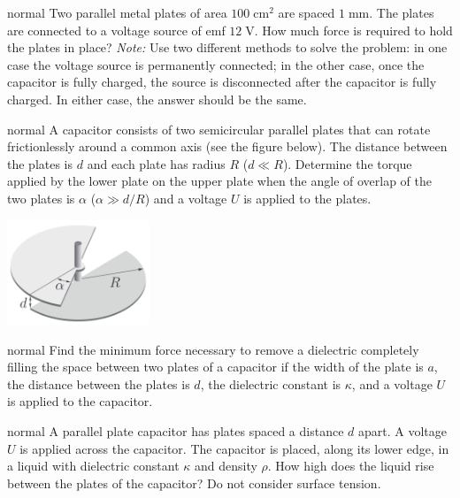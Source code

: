 \hypertarget{P51}{}
\begin{solution}{normal} %
Two parallel metal plates of area $100\;\text{cm}^2$ are spaced $1\;\text{mm}$. The plates are connected to a voltage source of emf $12\;\text{V}$. How much force is required to hold the plates in place? \textit{Note:} Use two different methods to solve the problem: in one case the voltage source is permanently connected; in the other case, once the capacitor is fully charged, the source is disconnected after the capacitor is fully charged. In either case, the answer should be the same. 
\end{solution}

\hypertarget{P52}{}
\begin{solution}{normal} %
A capacitor consists of two semicircular parallel plates that can rotate frictionlessly around a common axis (see the figure below). The distance between the plates is $d$ and each plate has radius $R$ ($d\ll R$). Determine the torque applied by the lower plate on the upper plate when the angle of overlap of the two plates is $\alpha$ ($\alpha\gg d/R$) and a voltage $U$ is applied to the plates.
\begin{center}
    \includegraphics[width=0.32\textwidth]{S2 Figures/S2-52.png}
\end{center}
\end{solution}

\hypertarget{P53}{}
\begin{solution}{normal} %
Find the minimum force necessary to remove a dielectric completely filling the space between two plates of a capacitor if the width of the plate is $a$, the distance between the plates is $d$, the dielectric constant is $\kappa$, and a voltage $U$ is applied to the capacitor.
\end{solution}

\hypertarget{P54}{}
\begin{solution}{normal} %
A parallel plate capacitor has plates spaced a distance $d$ apart. A voltage $U$ is applied across the capacitor. The capacitor is placed, along its lower edge, in a liquid with dielectric constant $\kappa$ and density $\rho$. How high does the liquid rise between the plates of the capacitor? Do not consider surface tension.
\end{solution}

